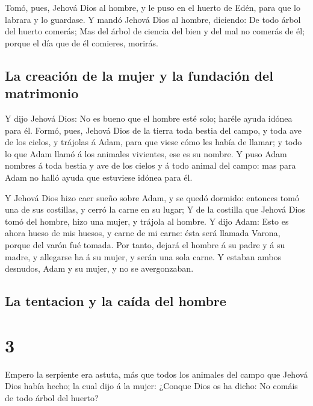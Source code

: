  Tomó, pues, Jehová Dios al hombre, y le puso en el
huerto de Edén, para que lo labrara y lo guardase.  Y
mandó Jehová Dios al hombre, diciendo: De todo árbol del huerto comerás;
 Mas del árbol de ciencia del bien y del mal no comerás
de él; porque el día que de él comieres, morirás.

\hypertarget{la-creaciuxf3n-de-la-mujer-y-la-fundaciuxf3n-del-matrimonio}{%
\subsection{La creación de la mujer y la fundación del
matrimonio}\label{la-creaciuxf3n-de-la-mujer-y-la-fundaciuxf3n-del-matrimonio}}

 Y dijo Jehová Dios: No es bueno que el hombre esté solo;
haréle ayuda idónea para él.  Formó, pues, Jehová Dios de
la tierra toda bestia del campo, y toda ave de los cielos, y trájolas á
Adam, para que viese cómo les había de llamar; y todo lo que Adam llamó
á los animales vivientes, ese es su nombre.  Y puso Adam
nombres á toda bestia y ave de los cielos y á todo animal del campo: mas
para Adam no halló ayuda que estuviese idónea para él.

 Y Jehová Dios hizo caer sueño sobre Adam, y se quedó
dormido: entonces tomó una de sus costillas, y cerró la carne en su
lugar;  Y de la costilla que Jehová Dios tomó del hombre,
hizo una mujer, y trájola al hombre.  Y dijo Adam: Esto
es ahora hueso de mis huesos, y carne de mi carne: ésta será llamada
Varona, porque del varón fué tomada.  Por tanto, dejará
el hombre á su padre y á su madre, y allegarse ha á su mujer, y serán
una sola carne.  Y estaban ambos desnudos, Adam y su
mujer, y no se avergonzaban.

\hypertarget{la-tentacion-y-la-cauxedda-del-hombre}{%
\subsection{La tentacion y la caída del
hombre}\label{la-tentacion-y-la-cauxedda-del-hombre}}

\hypertarget{section-2}{%
\section{3}\label{section-2}}

 Empero la serpiente era astuta, más que todos los
animales del campo que Jehová Dios había hecho; la cual dijo á la mujer:
¿Conque Dios os ha dicho: No comáis de todo árbol del huerto?

